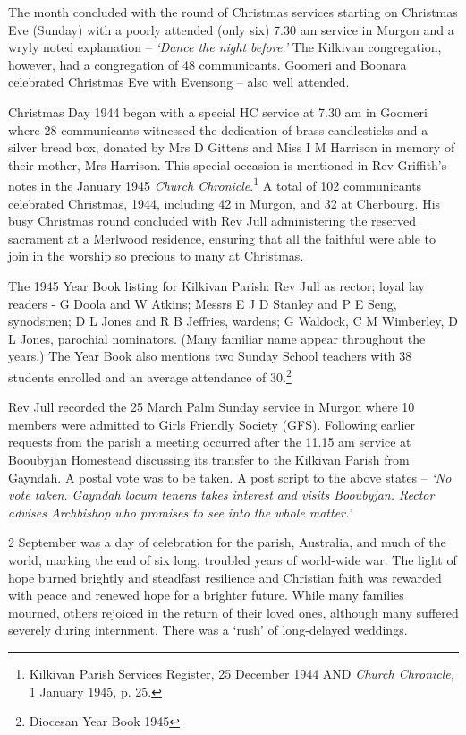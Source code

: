The month concluded with the round of Christmas services starting on Christmas Eve (Sunday) with a poorly attended (only six) 7.30 am service in Murgon and a wryly noted explanation -- \emph{`Dance the night before.'} The Kilkivan congregation, however, had a congregation of 48 communicants. Goomeri and Boonara celebrated Christmas Eve with Evensong -- also well attended.

Christmas Day 1944 began with a special HC service at 7.30 am in Goomeri where 28 communicants witnessed the dedication of brass candlesticks and a silver bread box, donated by Mrs D Gittens and Miss I M Harrison in memory of their mother, Mrs Harrison. This special occasion is mentioned in Rev Griffith's notes in the January 1945 \emph{Church Chronicle}.\footnote{Kilkivan Parish Services Register, 25 December 1944 AND \emph{Church Chronicle,} 1 January 1945, p. 25.} A total of 102 communicants celebrated Christmas, 1944, including 42 in Murgon, and 32 at Cherbourg. His busy Christmas round concluded with Rev Jull administering the reserved sacrament at a Merlwood residence, ensuring that all the faithful were able to join in the worship so precious to many at Christmas.

The 1945 Year Book listing for Kilkivan Parish: Rev Jull as rector; loyal lay readers - G Doola and W Atkins; Messrs E J D Stanley and P E Seng, synodsmen; D L Jones and R B Jeffries, wardens; G Waldock, C M Wimberley, D L Jones, parochial nominators. (Many familiar name appear throughout the years.) The Year Book also mentions two Sunday School teachers with 38 students enrolled and an average attendance of 30.\footnote{Diocesan Year Book 1945}

Rev Jull recorded the 25 March Palm Sunday service in Murgon where 10 members were admitted to Girls Friendly Society (GFS). Following earlier requests from the parish a meeting occurred after the 11.15 am service at Booubyjan Homestead discussing its transfer to the Kilkivan Parish from Gayndah. A postal vote was to be taken. A post script to the above states -- \emph{`No vote taken. Gayndah locum tenens takes interest and visits Booubyjan. Rector advises Archbishop who promises to see into the whole matter.'}

2 September was a day of celebration for the parish, Australia, and much of the world, marking the end of six long, troubled years of world-wide war. The light of hope burned brightly and steadfast resilience and Christian faith was rewarded with peace and renewed hope for a brighter future. While many families mourned, others rejoiced in the return of their loved ones, although many suffered severely during internment. There was a `rush' of long-delayed weddings.

